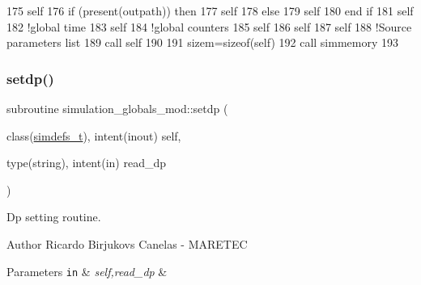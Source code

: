 \begin{DoxyCode}
175     self%
176     \textcolor{keywordflow}{if} (\textcolor{keyword}{present}(outpath)) \textcolor{keywordflow}{then}
177         self%
178     \textcolor{keywordflow}{else}
179         self%
180 \textcolor{keywordflow}{    end if}
181     self%
182     \textcolor{comment}{!global time}
183     self%
184     \textcolor{comment}{!global counters}
185     self%
186     self%
187     self%
188     \textcolor{comment}{!Source parameters list}
189     \textcolor{keyword}{call }self%
190 
191     sizem=sizeof(self)
192     \textcolor{keyword}{call }simmemory%
193 
\end{DoxyCode}
\mbox{\label{namespacesimulation__globals__mod_acb8e3762572266b40a0deb166dded33a}} 
\subsubsection{\texorpdfstring{setdp()}{setdp()}}
{\footnotesize\ttfamily subroutine simulation\+\_\+globals\+\_\+mod\+::setdp (\begin{DoxyParamCaption}\item[{class(\mbox{\hyperlink{structsimulation__globals__mod_1_1simdefs__t}{simdefs\+\_\+t}}), intent(inout)}]{self,  }\item[{type(string), intent(in)}]{read\+\_\+dp }\end{DoxyParamCaption})\hspace{0.3cm}{\ttfamily [private]}}



Dp setting routine. 

\begin{DoxyAuthor}{Author}
Ricardo Birjukovs Canelas -\/ M\+A\+R\+E\+T\+EC 
\end{DoxyAuthor}

\begin{DoxyParams}[1]{Parameters}
\mbox{\tt in}  & {\em self,read\+\_\+dp} & \\
\hline
\end{DoxyParams}



